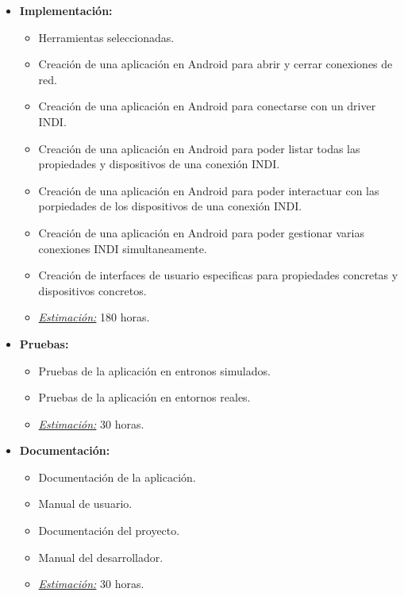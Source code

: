 \begin{itemize}
 \item \textbf{Implementación:}
 \begin{itemize}
  \item Herramientas seleccionadas.
  \item Creación de una aplicación en Android para abrir y cerrar conexiones de red.
  \item Creación de una aplicación en Android para conectarse con un driver INDI.
  \item Creación de una aplicación en Android para poder listar todas las propiedades y dispositivos de una conexión INDI.
  \item Creación de una aplicación en Android para poder interactuar con las porpiedades de los dispositivos de una conexión INDI.
  \item Creación de una aplicación en Android para poder gestionar varias conexiones INDI simultaneamente.
  \item Creación de interfaces de usuario especificas para propiedades concretas y dispositivos concretos.
  \item \underline{\textit{Estimación:}} 180 horas.
 \end{itemize}
\end{itemize}

\begin{itemize}
 \item \textbf{Pruebas:}
 \begin{itemize}
  \item Pruebas de la aplicación en entronos simulados.
  \item Pruebas de la aplicación en entornos reales.
  \item \underline{\textit{Estimación:}} 30 horas.
 \end{itemize}
\end{itemize}

\begin{itemize}
 \item \textbf{Documentación:}
 \begin{itemize}
  \item Documentación de la aplicación.
  \item Manual de usuario.
  \item Documentación del proyecto.
  \item Manual del desarrollador.
  \item \underline{\textit{Estimación:}} 30 horas.
 \end{itemize}
\end{itemize}

